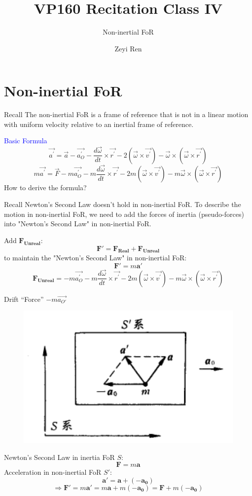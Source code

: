 \documentclass{beamer}
\title{VP160 Recitation Class IV}
\subtitle{Non-inertial FoR}
\author{Zeyi Ren}
\institute{UM-SJTU Joint Institute}
\begin{document}
\maketitle


\section{Non-inertial FoR}
\begin{frame}
  \begin{block}{Recall}
    The non-inertial FoR is a frame of reference that is not in a linear motion with uniform velocity relative to an inertial frame of reference.
  \end{block}
  \textcolor{blue}{Basic Formula}
  $$
  \vec{a^{\prime}}=\vec{a}-\vec{a_{O}^{\prime}}-\frac{d \vec{\omega}}{d t} \times \vec{r^{\prime}}-2(\vec{\omega} \times \vec{v^{\prime}})-\vec{\omega} \times(\vec{\omega} \times \vec{r^{\prime}})
  $$
  $$
  m \vec{a^{\prime}}=\vec{F}-m \vec{a_{O}^{\prime}}-m \frac{d \vec{\omega}}{d t} \times \vec{r^{\prime}}-2 m(\vec{\omega} \times \vec{v^{\prime}})-m \vec{\omega} \times(\vec{\omega} \times \vec{r^{\prime}})
  $$
  How to derive the formula?
\end{frame}

\begin{frame}
  \begin{block}{Recall}
    Newton's Second Law doesn't hold in non-inertial FoR. To describe the motion in non-inertial FoR, we need to add the forces of inertia (pseudo-forces) into "Newton's Second Law" in non-inertial FoR.
  \end{block}
  Add $\mathbf{F_{Unreal}}$:
  $$
  \mathbf{F'} = \mathbf{F_{Real}} + \mathbf{F_{Unreal}}
  $$
  to maintain the "Newton's Second Law" in non-inertial FoR:
  $$
  \mathbf{F'} = m \mathbf{a'}
  $$
  $$
  \mathbf{F_{Unreal}} = -m \vec{a_{O}^{\prime}}-m \frac{d \vec{\omega}}{d t} \times \vec{r^{\prime}}-2 m(\vec{\omega} \times \vec{v^{\prime}})-m \vec{\omega} \times(\vec{\omega} \times \vec{r^{\prime}})
  $$
\end{frame}

\begin{frame}{Drift ``Force'' $-m\vec{a_{O'}}$}  
\begin{figure}[H]
\centering
\includegraphics[width=0.35 \linewidth, angle =0]{drift.png}
\label{fig:1}
\end{figure}
Newton's Second Law in inertia FoR $S$: 
$$\mathbf{F}=m\mathbf{a}$$
Acceleration in non-inertial FoR $S'$:
$$\mathbf{a'} = \mathbf{a}+(-\mathbf{a_0})$$
$$\Rightarrow \mathbf{F'}= m\mathbf{a'}=m\mathbf{a}+m(-\mathbf{a_0})=\mathbf{F}+m(-\mathbf{a_0})$$
\end{frame}
\end{document}
